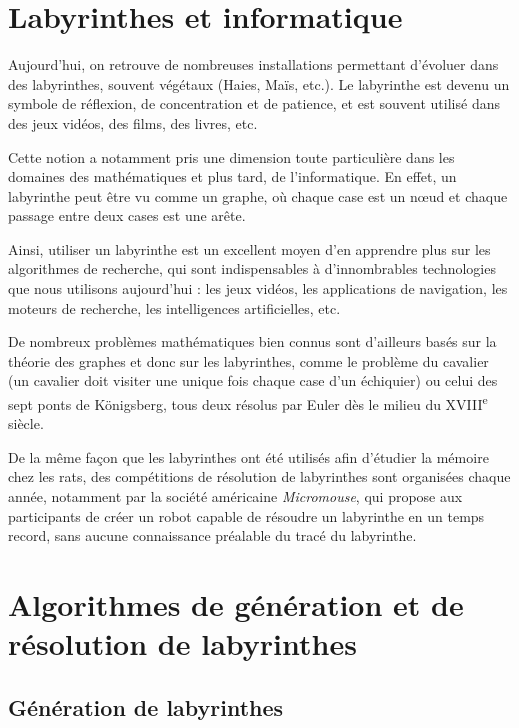 \documentclass[12pt]{scrreprt} %
\begin{document}
\section{Labyrinthes et informatique}

Aujourd'hui, on retrouve de nombreuses installations permettant d'évoluer dans des labyrinthes, souvent végétaux (Haies, Maïs, etc.). Le labyrinthe est devenu un symbole de réflexion, de concentration et de patience, et est souvent utilisé dans des jeux vidéos, des films, des livres, etc.

Cette notion a notamment pris une dimension toute particulière dans les domaines des mathématiques et plus tard, de l'informatique. En effet, un labyrinthe peut être vu comme un graphe, où chaque case est un nœud et chaque passage entre deux cases est une arête.

Ainsi, utiliser un labyrinthe est un excellent moyen d'en apprendre plus sur les algorithmes de recherche, qui sont indispensables à d'innombrables technologies que nous utilisons aujourd'hui : les jeux vidéos, les applications de navigation, les moteurs de recherche, les intelligences artificielles, etc.

De nombreux problèmes mathématiques bien connus sont d'ailleurs basés sur la théorie des graphes et donc sur les labyrinthes, comme le problème du cavalier (un cavalier doit visiter une unique fois chaque case d'un échiquier) ou celui des sept ponts de Königsberg, tous deux résolus par Euler dès le milieu du XVIII\textsuperscript{e} siècle\cite{Alexanderson2006}\cite{Euler1759}.

De la même façon que les labyrinthes ont été utilisés afin d'étudier la mémoire chez les rats, des compétitions de résolution de labyrinthes sont organisées chaque année, notamment par la société américaine \textit{Micromouse}, qui propose aux participants de créer un robot capable de résoudre un labyrinthe en un temps record, sans aucune connaissance préalable du tracé du labyrinthe.\cite{Veritasium2023}

\section{Algorithmes de génération et de résolution de labyrinthes}

\subsection{Génération de labyrinthes}
\end{document}
